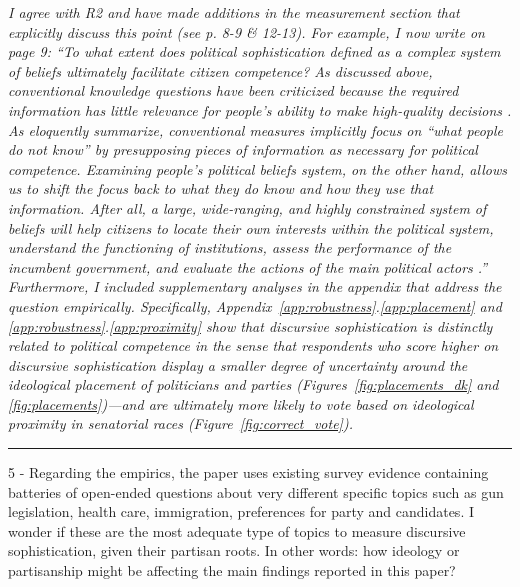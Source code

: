 \textit{I agree with R2 and have made additions in the measurement section that explicitly discuss this point (see p. 8-9 \& 12-13). For example, I now write on page 9: ``To what extent does political sophistication defined as a complex system of beliefs ultimately facilitate citizen competence? As discussed above, conventional knowledge questions have been criticized because the required information has little relevance for people's ability to make high-quality decisions \citep{lupia2006elitism}. As \citeauthor{cramer2017fact} eloquently summarize, conventional measures implicitly focus on ``what people do \textit{not} know'' \citeyearpar[756, emphasis added]{cramer2017fact} by presupposing pieces of information as necessary for political competence. Examining people's political beliefs system, on the other hand, allows us to shift the focus back to \textit{what they do know} and how they use that information. After all, a large, wide-ranging, and highly constrained system of beliefs will help citizens to locate their own interests within the political system, understand the functioning of institutions, assess the performance of the incumbent government, and evaluate the actions of the main political actors \citep[e.g.,][]{converse1964nature}.'' Furthermore, I included supplementary analyses in the appendix that address the question empirically. Specifically, Appendix~\ref{app:robustness}.\ref{app:placement} and \ref{app:robustness}.\ref{app:proximity} show that discursive sophistication is distinctly related to political competence in the sense that respondents who score higher on discursive sophistication display a smaller degree of uncertainty around the ideological placement of politicians and parties (Figures~\ref{fig:placements_dk} and \ref{fig:placements})---and are ultimately more likely to vote based on ideological proximity in senatorial races (Figure~\ref{fig:correct_vote}).}


\rule{\linewidth}{.01cm}

5 - Regarding the empirics, the paper uses existing survey evidence containing batteries of open-ended questions about very different specific topics such as gun legislation, health care, immigration, preferences for party and candidates. I wonder if these are the most adequate type of topics to measure discursive sophistication, given their partisan roots. In other words: how ideology or partisanship might be affecting the main findings reported in this paper?

